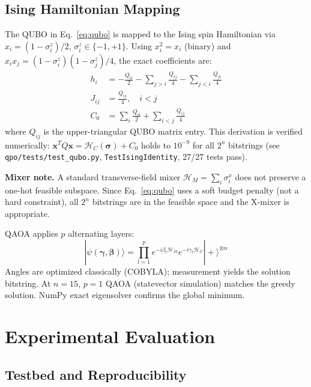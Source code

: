 \documentclass[journal]{IEEEtran}
\begin{document}
\subsection{Ising Hamiltonian Mapping}

The QUBO in Eq.~\eqref{eq:qubo} is mapped to the Ising spin Hamiltonian via
$x_i = (1 - \sigma_i^z)/2$, $\sigma_i^z \in \{-1,+1\}$.
Using $x_i^2 = x_i$ (binary) and $x_i x_j = (1-\sigma_i^z)(1-\sigma_j^z)/4$,
the exact coefficients are:
\begin{align}
h_i    &= -\frac{Q_{ii}}{2} - \sum_{j>i}\frac{Q_{ij}}{4}
           - \sum_{j<i}\frac{Q_{ji}}{4} \label{eq:h}\\
J_{ij} &= \frac{Q_{ij}}{4}, \quad i < j \label{eq:J}\\
C_0    &= \sum_i \frac{Q_{ii}}{2} + \sum_{i<j}\frac{Q_{ij}}{4}
\label{eq:const}
\end{align}
where $Q_{ij}$ is the upper-triangular QUBO matrix entry.
This derivation is verified numerically: $\mathbf{x}^T Q \mathbf{x} =
\mathcal{H}_C(\boldsymbol{\sigma}) + C_0$ holds to $10^{-9}$ for all
$2^n$ bitstrings (see \texttt{qpo/tests/test\_qubo.py},
\texttt{TestIsingIdentity}, 27/27 tests pass).

\textbf{Mixer note.} A standard transverse-field mixer
$\mathcal{H}_M = \sum_i \sigma_i^x$ does not preserve a one-hot feasible
subspace. Since Eq.~\eqref{eq:qubo} uses a soft budget penalty (not a
hard constraint), all $2^n$ bitstrings are in the feasible space and the
X-mixer is appropriate.

QAOA applies $p$ alternating layers:
\begin{equation}
|\psi(\boldsymbol{\gamma}, \boldsymbol{\beta})\rangle =
\prod_{l=1}^p e^{-i\beta_l \mathcal{H}_M} e^{-i\gamma_l \mathcal{H}_C}
|+\rangle^{\otimes n}
\end{equation}
Angles are optimized classically (COBYLA); measurement yields the solution
bitstring. At $n{=}15$, $p{=}1$ QAOA (statevector simulation) matches
the greedy solution. NumPy exact eigensolver confirms the global minimum.

\section{Experimental Evaluation}

\subsection{Testbed and Reproducibility}
\end{document}
